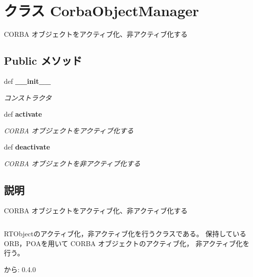 \section{クラス CorbaObjectManager}
\label{classsource__py_1_1_corba_object_manager_1_1_corba_object_manager}
CORBA オブジェクトをアクティブ化、非アクティブ化する  


\subsection*{Public メソッド}
\begin{CompactItemize}
\item 
def {\bf \_\-\_\-init\_\-\_\-}
\begin{CompactList}\small\item\em コンストラクタ \item\end{CompactList}\item 
def {\bf activate}
\begin{CompactList}\small\item\em CORBA オブジェクトをアクティブ化する \item\end{CompactList}\item 
def {\bf deactivate}
\begin{CompactList}\small\item\em CORBA オブジェクトを非アクティブ化する \item\end{CompactList}\end{CompactItemize}


\subsection{説明}
CORBA オブジェクトをアクティブ化、非アクティブ化する 



\footnotesize\begin{verbatim}
\end{verbatim}
\normalsize


RTObjectのアクティブ化，非アクティブ化を行うクラスである。 保持しているORB，POAを用いて CORBA オブジェクトのアクティブ化， 非アクティブ化を行う。

\begin{Desc}
\item[から:]0.4.0 \end{Desc}


